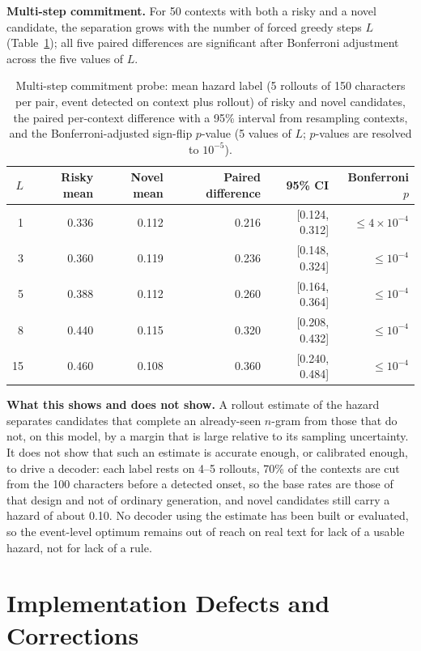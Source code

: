 \documentclass[make,article,submit,pdftex]{Definitions/mdpi}
\begin{document}
\textbf{Multi-step commitment.} For 50 contexts with both a risky and a novel candidate, the separation grows with the number of forced greedy steps $L$ (Table~\ref{tab:hazardprobe}); all five paired differences are significant after Bonferroni adjustment across the five values of $L$.

\begin{table}[H]
\centering
\caption{Multi-step commitment probe: mean hazard label (5 rollouts of 150 characters per pair, event detected on context plus rollout) of risky and novel candidates, the paired per-context difference with a 95\% interval from resampling contexts, and the Bonferroni-adjusted sign-flip $p$-value (5 values of $L$; $p$-values are resolved to $10^{-5}$).}
\label{tab:hazardprobe}
\begin{tabular}{@{}rrrrrr@{}}
\toprule
$L$ & Risky mean & Novel mean & Paired difference & 95\% CI & Bonferroni $p$ \\
\midrule
1  & 0.336 & 0.112 & 0.216 & [0.124, 0.312] & $\le4\times10^{-4}$ \\
3  & 0.360 & 0.119 & 0.236 & [0.148, 0.324] & $\le10^{-4}$ \\
5  & 0.388 & 0.112 & 0.260 & [0.164, 0.364] & $\le10^{-4}$ \\
8  & 0.440 & 0.115 & 0.320 & [0.208, 0.432] & $\le10^{-4}$ \\
15 & 0.460 & 0.108 & 0.360 & [0.240, 0.484] & $\le10^{-4}$ \\
\bottomrule
\end{tabular}
\end{table}

\textbf{What this shows and does not show.} A rollout estimate of the hazard separates candidates that complete an already-seen $n$-gram from those that do not, on this model, by a margin that is large relative to its sampling uncertainty. It does not show that such an estimate is accurate enough, or calibrated enough, to drive a decoder: each label rests on 4--5 rollouts, 70\% of the contexts are cut from the 100 characters before a detected onset, so the base rates are those of that design and not of ordinary generation, and novel candidates still carry a hazard of about 0.10. No decoder using the estimate has been built or evaluated, so the event-level optimum remains out of reach on real text for lack of a usable hazard, not for lack of a rule.


\section{Implementation Defects and Corrections}
\label{app:defects}
\end{document}
